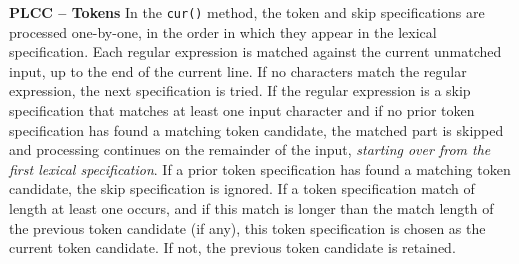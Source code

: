 \begin{minipage}[t]{\sw}
\slidenumber
\LARGE
{\bf PLCC -- Tokens}\exx
In the \verb'cur()' method,
the token and skip specifications are processed one-by-one,
in the order in which they appear
in the lexical specification.
Each regular expression is matched
against the current unmatched input,
up to the end of the current line.
If no characters match the regular expression,
the next specification is tried.\exx
If the regular expression is a skip specification
that matches at least one input character
and if no prior token specification has found a matching token candidate,
the matched part is skipped and processing continues
on the remainder of the input,
{\em starting over from the first lexical specification}.
If a prior token specification has found a matching token candidate,
the skip specification is ignored.\exx
If a token specification match of length at least one occurs,
and if this match is longer than the match length
of the previous token candidate (if any),
this token specification is chosen
as the current token candidate.
If not, the previous token candidate is retained.\exx
\end{minipage}
\clearpage
